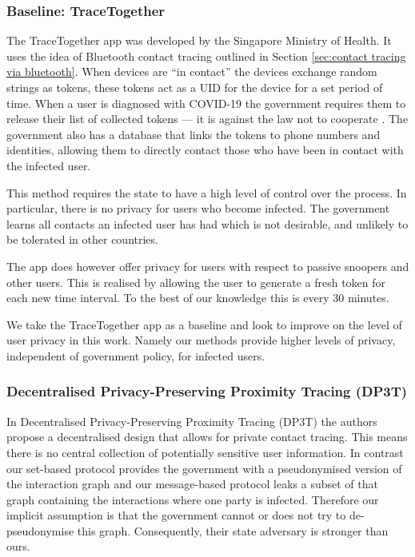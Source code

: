 \documentclass{article}
\begin{document}
\subsubsection{Baseline: TraceTogether} \label{sec:tracetogether}

The TraceTogether app \cite{tracetogether} was developed by the Singapore Ministry of Health. It uses the idea of Bluetooth contact tracing outlined in Section \ref{sec:contact tracing via bluetooth}. When devices are ``in contact'' the devices exchange random strings as tokens, these tokens act as a UID for the device for a set period of time. When a user is diagnosed with COVID-19 the government requires them to release their list of collected tokens --- it is against the law not to cooperate \cite{tracetogether_law}. The government also has a database that links the tokens to phone numbers and identities, allowing them to directly contact those who have been in contact with the infected user. 

This method requires the state to have a high level of control over the process. In particular, there is no privacy for users who become infected. The government learns all contacts an infected user has had which is not desirable, and unlikely to be tolerated in other countries.

The app does however offer privacy for users with respect to passive snoopers and other users. This is realised by allowing the user to generate a fresh token for each new time interval. To the best of our knowledge this is every 30 minutes.

We take the TraceTogether app as a baseline and look to improve on the level of user privacy in this work. Namely our methods provide higher levels of privacy, independent of government policy, for infected users.

\subsubsection{Decentralised Privacy-Preserving Proximity Tracing (DP3T)}

In Decentralised Privacy-Preserving Proximity Tracing (DP3T) \cite{DP3T} the authors propose a decentralised design that allows for private contact tracing. This means there is no central collection of potentially sensitive user information. In contrast our set-based protocol provides the government with a pseudonymised version of the interaction graph and our message-based protocol leaks a subset of that graph containing the interactions where one party is infected. Therefore our implicit assumption is that the government cannot or does not try to de-pseudonymise this graph. Consequently, their state adversary is stronger than ours. 
\end{document}
